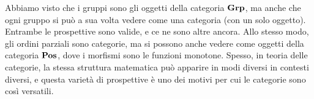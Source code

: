 \begin{remark}
 Abbiamo visto che i gruppi sono gli oggetti della categoria $\mathbf{Grp}$, ma anche che ogni gruppo si può a sua volta vedere come una categoria (con un solo oggetto). Entrambe le prospettive sono valide, e ce ne sono altre ancora.
 Allo stesso modo, gli ordini parziali sono categorie, ma si possono anche vedere come oggetti della categoria $\mathbf{Pos}$, dove i morfismi sono le funzioni monotone.
 Spesso, in teoria delle categorie, la stessa struttura matematica può apparire in modi diversi in contesti diversi, e questa varietà di prospettive è uno dei motivi per cui le categorie sono così versatili.
\end{remark}







